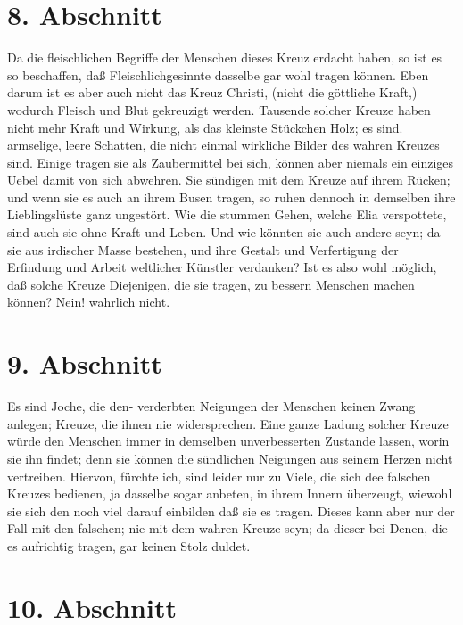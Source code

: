 \section{8. Abschnitt} \label{kap5_ab8}

Da die fleischlichen Begriffe der Menschen dieses Kreuz erdacht haben, so ist es
so beschaffen, daß Fleischlichgesinnte dasselbe gar wohl tragen können. Eben
darum ist es aber auch nicht das Kreuz Christi, (nicht die göttliche Kraft,)
wodurch Fleisch und Blut gekreuzigt werden. Tausende solcher Kreuze haben nicht
mehr Kraft und Wirkung, als das kleinste Stückchen Holz; es sind. armselige,
leere Schatten, die nicht einmal wirkliche Bilder des wahren Kreuzes sind.
Einige tragen sie als Zaubermittel bei sich, können aber niemals ein einziges
Uebel damit von sich abwehren. Sie sündigen mit dem Kreuze auf ihrem Rücken; und
wenn sie es auch an ihrem Busen tragen, so ruhen dennoch in demselben ihre
Lieblingslüste ganz ungestört. Wie die stummen Gehen, welche Elia verspottete,
sind auch sie ohne Kraft und Leben. Und wie könnten sie auch andere seyn; da sie
aus irdischer Masse bestehen, und ihre Gestalt und Verfertigung der Erfindung
und Arbeit weltlicher Künstler verdanken? Ist es also wohl möglich, daß solche
Kreuze Diejenigen, die sie tragen, zu bessern Menschen machen können? Nein!
wahrlich nicht.

\section{9. Abschnitt} \label{kap5_ab9}

Es sind Joche, die den- verderbten Neigungen der Menschen keinen Zwang anlegen;
Kreuze, die ihnen nie widersprechen. Eine ganze Ladung solcher Kreuze würde den
Menschen immer in demselben unverbesserten Zustande lassen, worin sie ihn
findet; denn sie können die sündlichen Neigungen aus seinem Herzen nicht
vertreiben. Hiervon, fürchte ich, sind leider nur zu Viele, die sich dee
falschen Kreuzes bedienen, ja dasselbe sogar anbeten, in ihrem Innern überzeugt,
wiewohl sie sich den noch viel darauf einbilden daß sie es tragen. Dieses kann
aber nur der Fall mit den falschen; nie mit dem wahren Kreuze seyn; da dieser
bei Denen, die es aufrichtig tragen, gar keinen Stolz duldet.

\section{10. Abschnitt} \label{kap5_ab10}

